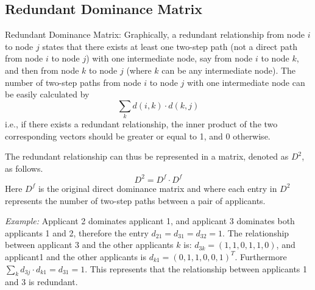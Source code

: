 \documentclass[12pt,english]{report}
\begin{document}
\subsection{Redundant Dominance Matrix}
Redundant Dominance Matrix:  Graphically, a redundant relationship from node $i$ to node $j$ states that there exists at least one two-step path (not a direct path from node $i$ to node $j$) with one intermediate node, say from node $i$ to node $k$, and then from node $k$ to node $j$ (where $k$ can be any intermediate node).  The number of two-step paths from node $i$ to node $j$ with one intermediate node can be easily calculated by $$ \sum_k d(i,k) \cdot  d(k,j)$$ i.e., if there exists a redundant relationship, the inner product of the two corresponding vectors should be greater or equal to 1, and 0 otherwise.

The redundant relationship can thus be represented in a matrix, denoted as $D^2$,  as follows. $$D^2 = D^{f} \cdot D^{f} $$  Here $D^f$ is the original direct dominance matrix and where each entry in $D^2$ represents the number of two-step paths between a pair of applicants.
 
\noindent \textit{Example:} Applicant 2 dominates applicant 1, and applicant 3 dominates both applicants 1 and 2, therefore the entry $d_{21}=d_{31}=d_{32}=1$. The relationship between applicant 3 and the other applicants $k$ is: $d_{3k}=(1,1,0,1,1,0)$, and applicant1 and the other applicants is $d_{k1}=(0,1,1,0,0,1) ^T $. Furthermore $\sum_k d_{3j} \cdot d_{k1}=d_{31}=1$. This represents that the relationship between applicants 1 and 3 is redundant.
\end{document}

